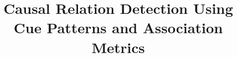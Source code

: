 \documentclass[11pt,letterpaper]{article}
\begin{document}
\title{Causal Relation Detection Using Cue Patterns and Association Metrics
}


\maketitle








%

\end{document}
